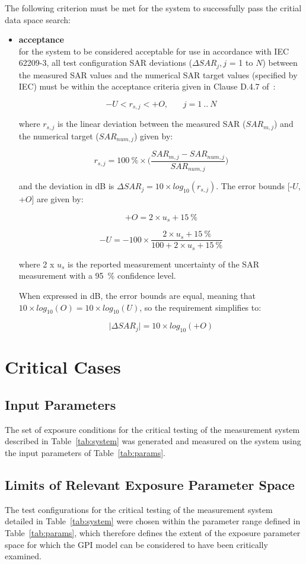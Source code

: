\documentclass{article}
\begin{document}
The following criterion must be met for the system to successfully pass the critial data space search:

\begin{itemize}
\item \textbf{acceptance}\\ for the system to be considered acceptable for use in accordance with IEC 62209-3, all test configuration SAR deviations ($\Delta SAR_j, j$ = 1 to $N$) between the measured SAR values and the numerical SAR target values (specified by IEC) must be within the acceptance criteria given in Clause D.4.7 of~\cite{standard}:

\[
-U < r_{s,j} < +O, ~~~~~~~~ j = 1~..~N
\]

where $r_{s,j}$ is the linear deviation between the measured SAR ($SAR_{m,j}$) and the numerical target ($SAR_{num,j}$) given by:

\[
r_{s,j} = 100~\% \times \Big(\frac{SAR_{m,j} - SAR_{num,j}}{SAR_{num,j}}\Big)
\]

and the deviation in dB is $\Delta SAR_j = 10 \times log_{10} (r_{s,j})$. The error bounds [-$U$, +$O$] are given by:

\[
+O = 2 \times u_s + 15~\%
\]

\[
-U = -100 \times \frac{2 \times u_s + 15~\%}{100 + 2 \times u_s + 15~\%}
\]

where 2 x $u_s$ is the reported measurement uncertainty of the SAR measurement with a 95~\% confidence level.

When expressed in dB, the error bounds are equal, meaning that $10 \times log_{10}(O) = 10 \times log_{10}(U)$, so the requirement simplifies to:

\[
\big|\Delta SAR_j\big| = 10 \times log_{10}(+O)
\]
\end{itemize}

\section{Critical Cases}

\subsection{Input Parameters}
The set of exposure conditions for the critical testing of the measurement system described in Table~\ref{tab:system} was generated and measured on the system using the input parameters of Table~\ref{tab:params}.

\subsection{Limits of Relevant Exposure Parameter Space}
The test configurations for the critical testing of the measurement system detailed in Table~\ref{tab:system} were chosen within the parameter range defined in Table~\ref{tab:params}, which therefore defines the extent of the exposure parameter space for which the GPI model can be considered to have been critically examined.
\end{document}
